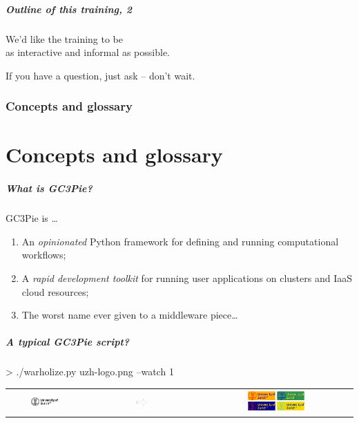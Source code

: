 \documentclass[english,serif,mathserif,usenames,dvipsnames]{beamer}
\begin{document}
\begin{frame}
  \frametitle{Outline of this training, 2}
  \begin{center}
    We'd like the training to be \\ as interactive and informal as possible.

    \+ If you have a question, just ask -- don't wait.
  \end{center}
\end{frame}


\section{Concepts and glossary}
\part{Concepts and glossary}

\begin{frame}
  \frametitle{What is GC3Pie?}
  GC3Pie is \ldots
  \begin{enumerate}
  \item \alert<2>{An \emph{opinionated} Python framework for defining and running computational workflows;}
  \item \alert<1>{A \emph{rapid development toolkit} for running user applications on clusters and IaaS cloud resources;}
  \item The worst name ever given to a middleware piece\ldots
  \end{enumerate}

  \+
\end{frame}


\begin{frame}
  \frametitle{A typical GC3Pie script?}

\begin{semiverbatim}
    > ./warholize.py uzh-logo.png --watch 1
\end{semiverbatim}

  \begin{tabular}[c]{ccc}
    \includegraphics[width=0.4\textwidth]{fig/uzh-logo.png}
    &
    \includegraphics[width=0.1\textwidth]{fig/arrow.pdf}
    &
    \includegraphics[width=0.4\textwidth]{fig/warholized-uzh-logo.png}
  \end{tabular}
\end{frame}
\end{document}
